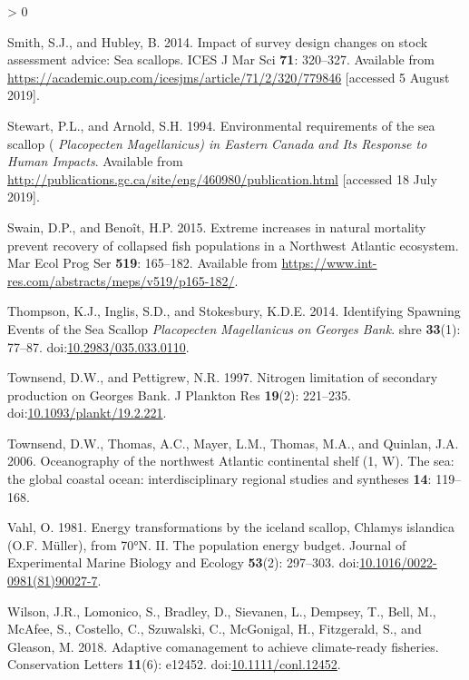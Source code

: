 \documentclass[
]{article}
\newlength{\cslhangindent}
\newenvironment{CSLReferences}[2] %
 {%
  \setlength{\parindent}{0pt}
  \ifodd #1 \everypar{\setlength{\hangindent}{\cslhangindent}}\ignorespaces\fi
  \ifnum #2 > 0
  \setlength{\parskip}{#2\baselineskip}
  \fi
 }%
 {}
\begin{document}
\begin{CSLReferences}{1}{0}
\leavevmode\hypertarget{ref-smithImpactSurveyDesign2014}{}%
Smith, S.J., and Hubley, B. 2014. Impact of survey design changes on stock assessment advice: Sea scallops. ICES J Mar Sci \textbf{71}: 320--327. Available from \url{https://academic.oup.com/icesjms/article/71/2/320/779846} {[}accessed 5 August 2019{]}.

\leavevmode\hypertarget{ref-stewartEnvironmentalRequirementsSea1994}{}%
Stewart, P.L., and Arnold, S.H. 1994. Environmental requirements of the sea scallop ( {\emph{Placopecten}}{ \emph{Magellanicus}}{\emph{\emph{) in Eastern}} }{\emph{\emph{Canada}}}{ \emph{\emph{and Its Response to Human Impacts}}}. Available from \url{http://publications.gc.ca/site/eng/460980/publication.html} {[}accessed 18 July 2019{]}.

\leavevmode\hypertarget{ref-swainExtremeIncreasesNatural2015}{}%
Swain, D.P., and Benoît, H.P. 2015. Extreme increases in natural mortality prevent recovery of collapsed fish populations in a {Northwest Atlantic} ecosystem. Mar Ecol Prog Ser \textbf{519}: 165--182. Available from \url{https://www.int-res.com/abstracts/meps/v519/p165-182/}.

\leavevmode\hypertarget{ref-thompsonIdentifyingSpawningEvents2014}{}%
Thompson, K.J., Inglis, S.D., and Stokesbury, K.D.E. 2014. Identifying {Spawning Events} of the {Sea Scallop} {\emph{Placopecten}}{ \emph{Magellanicus}}{ \emph{\emph{on}} }{\emph{\emph{Georges Bank}}}. shre \textbf{33}(1): 77--87. doi:\href{https://doi.org/10.2983/035.033.0110}{10.2983/035.033.0110}.

\leavevmode\hypertarget{ref-townsendNitrogenLimitationSecondary1997}{}%
Townsend, D.W., and Pettigrew, N.R. 1997. Nitrogen limitation of secondary production on {Georges Bank}. J Plankton Res \textbf{19}(2): 221--235. doi:\href{https://doi.org/10.1093/plankt/19.2.221}{10.1093/plankt/19.2.221}.

\leavevmode\hypertarget{ref-townsendOceanographyNorthwestAtlantic2006}{}%
Townsend, D.W., Thomas, A.C., Mayer, L.M., Thomas, M.A., and Quinlan, J.A. 2006. Oceanography of the northwest {Atlantic} continental shelf (1, {W}). The sea: the global coastal ocean: interdisciplinary regional studies and syntheses \textbf{14}: 119--168.

\leavevmode\hypertarget{ref-vahlEnergyTransformationsIceland1981}{}%
Vahl, O. 1981. Energy transformations by the iceland scallop, {Chlamys} islandica ({O}.{F}. {Müller}), from 70°{N}. {II}. {The} population energy budget. Journal of Experimental Marine Biology and Ecology \textbf{53}(2): 297--303. doi:\href{https://doi.org/10.1016/0022-0981(81)90027-7}{10.1016/0022-0981(81)90027-7}.

\leavevmode\hypertarget{ref-wilsonAdaptiveComanagementAchieve2018}{}%
Wilson, J.R., Lomonico, S., Bradley, D., Sievanen, L., Dempsey, T., Bell, M., McAfee, S., Costello, C., Szuwalski, C., McGonigal, H., Fitzgerald, S., and Gleason, M. 2018. Adaptive comanagement to achieve climate-ready fisheries. Conservation Letters \textbf{11}(6): e12452. doi:\href{https://doi.org/10.1111/conl.12452}{10.1111/conl.12452}.

\end{CSLReferences}

\newpage
\end{document}
